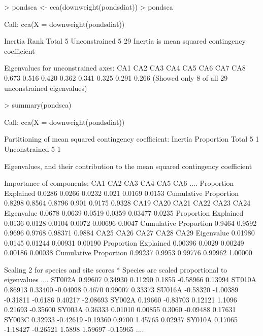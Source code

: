 \documentclass[a4paper,10pt]{article}
\begin{document}
\begin{Schunk}
\begin{Sinput}
> pondsca <- cca(downweight(pondsdiat))
> pondsca
\end{Sinput}
\begin{Soutput}
Call: cca(X = downweight(pondsdiat))

              Inertia Rank
Total               5     
Unconstrained       5   29
Inertia is mean squared contingency coefficient 

Eigenvalues for unconstrained axes:
  CA1   CA2   CA3   CA4   CA5   CA6   CA7   CA8 
0.673 0.516 0.420 0.362 0.341 0.325 0.291 0.266 
(Showed only 8 of all 29 unconstrained eigenvalues)
\end{Soutput}
\end{Schunk}
\begin{Schunk}
\begin{Sinput}
> summary(pondsca)
\end{Sinput}
\end{Schunk}
\begin{Schunk}
\begin{Soutput}
Call:
cca(X = downweight(pondsdiat)) 

Partitioning of mean squared contingency coefficient:
              Inertia Proportion
Total               5          1
Unconstrained       5          1

Eigenvalues, and their contribution to the mean squared contingency coefficient 

Importance of components:
                        CA1   CA2    CA3    CA4    CA5    CA6
....
Proportion Explained  0.0286 0.0266 0.0232 0.021 0.0169 0.0153
Cumulative Proportion 0.8298 0.8564 0.8796 0.901 0.9175 0.9328
                        CA19   CA20   CA21   CA22    CA23   CA24
Eigenvalue            0.0678 0.0639 0.0519 0.0359 0.03477 0.0235
Proportion Explained  0.0136 0.0128 0.0104 0.0072 0.00696 0.0047
Cumulative Proportion 0.9464 0.9592 0.9696 0.9768 0.98371 0.9884
                         CA25   CA26    CA27    CA28    CA29
Eigenvalue            0.01980 0.0145 0.01244 0.00931 0.00190
Proportion Explained  0.00396 0.0029 0.00249 0.00186 0.00038
Cumulative Proportion 0.99237 0.9953 0.99776 0.99962 1.00000

Scaling 2 for species and site scores
* Species are scaled proportional to eigenvalues
....
ST002A  0.99607  0.34930  0.11290  0.1855 -0.58966  0.13994
ST010A  0.86913  0.33400 -0.04098  0.4670  0.99007  0.33373
SU016A -0.58320 -1.00389 -0.31811 -0.6186  0.40217 -2.08693
SY002A  0.19660 -0.83703  0.12121  1.1096  0.21693 -0.35600
SY003A  0.36333  0.01010  0.00855  0.3060 -0.09488  0.17631
SY003C  0.32933 -0.42619 -0.19360  0.9700  1.45765  0.02937
SY010A  0.17065 -1.18427 -0.26521  1.5898  1.59697 -0.15965
....
\end{Soutput}
\end{Schunk}
\end{document}
